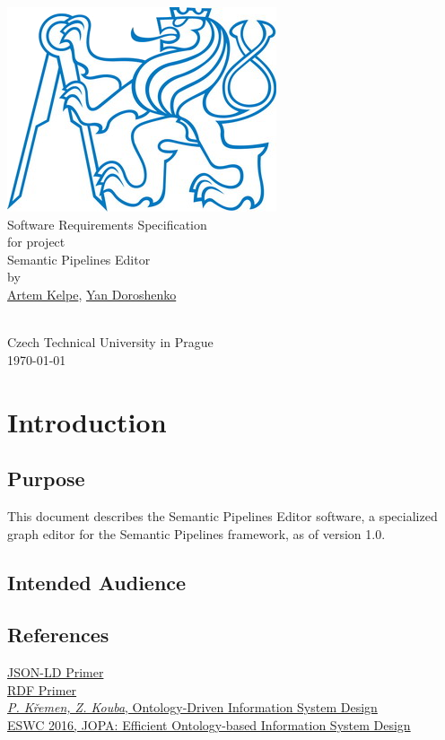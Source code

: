 \documentclass{article}
\begin{document}
\begin{center}
\rule{0pt}{0pt}
\vfill
\includegraphics[scale=0.9]{logo.png}\\
{\huge Software Requirements Specification\\}
for project\\
{\Large Semantic Pipelines Editor\\}
by\\
{\large\href{mailto:kelpeart@fel.cvut.cz}{Artem Kelpe}, \href{mailto:dorosyan@fel.cvut.cz}{Yan Doroshenko}\\}
\vfill
\rule{0pt}{90pt}\\
{\large Czech Technical University in Prague\\} \today
\end{center}
\newpage
\tableofcontents
\newpage
{}
\setcounter{page}{3}
\section{Introduction}
\subsection{Purpose}
This document describes the Semantic Pipelines Editor software, a specialized graph editor for the Semantic Pipelines framework, as of version 1.0.
\subsection{Intended Audience}
\subsection{References}
\href{http://json-ld.org/primer/latest/}{JSON-LD Primer}\\
\href{https://www.w3.org/TR/rdf11-primer/}{RDF Primer}\\
\href{http://ieeexplore.ieee.org/document/6011704/?arnumber=6011704\&tag=1}{\textit{P. Křemen, Z. Kouba}, Ontology-Driven Information System Design}\\
\href{http://2016.eswc-conferences.org/sites/default/files/papers/Accepted\%20Posters\%20and\%20Demos/ESWC2016_DEMO_JOPA.pdf}{ESWC 2016, JOPA: Efficient Ontology-based Information System Design}
\end{document}
